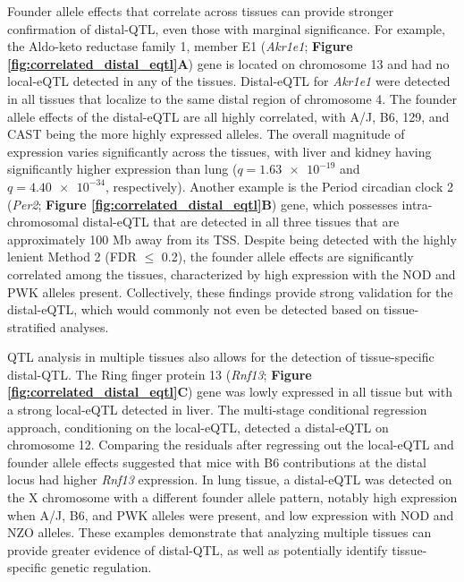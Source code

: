 \documentclass[9pt,twocolumn,twoside]{gsajnl}
\begin{document}
Founder allele effects that correlate across tissues can provide stronger confirmation of distal-QTL, even those with marginal significance. 
For example, the Aldo-keto reductase family 1, member E1 (\textit{Akr1e1}; \textbf{Figure \ref{fig:correlated_distal_eqtl}A}) gene is located on chromosome 13 and had no local-eQTL detected in any of the tissues. Distal-eQTL for \textit{Akr1e1} were detected in all tissues that localize to the same distal region of chromosome 4. The founder allele effects of the distal-eQTL are all highly correlated, with A/J, B6, 129, and CAST being the more highly expressed alleles. The overall magnitude of expression varies significantly across the tissues, with liver and kidney having significantly higher expression than lung ($q = \num{1.63e-19}$ and $q = \num{4.40e-34}$, respectively).
Another example is the Period circadian clock 2 (\textit{Per2}; \textbf{Figure \ref{fig:correlated_distal_eqtl}B}) gene, which possesses intra-chromosomal distal-eQTL that are detected in all three tissues that are approximately 100 Mb away from its TSS. Despite being detected with the highly lenient Method 2 (FDR $\leq$ 0.2), the founder allele effects are significantly correlated among the tissues, characterized by high expression with the NOD and PWK alleles present. Collectively, these findings provide strong validation for the distal-eQTL, which would commonly not even be detected based on tissue-stratified analyses.

QTL analysis in multiple tissues also allows for the detection of tissue-specific distal-QTL. The Ring finger protein 13 (\textit{Rnf13}; \textbf{Figure \ref{fig:correlated_distal_eqtl}C}) gene was lowly expressed in all tissue but with a strong local-eQTL detected in liver. The multi-stage conditional regression approach, conditioning on the local-eQTL, detected a distal-eQTL on chromosome 12. Comparing the residuals after regressing out the local-eQTL and founder allele effects suggested that mice with B6 contributions at the distal locus had higher \textit{Rnf13} expression. In lung tissue, a distal-eQTL was detected on the X chromosome with a different founder allele pattern, notably high expression when A/J, B6, and PWK alleles were present, and low expression with NOD and NZO alleles. These examples demonstrate that analyzing multiple tissues can provide greater evidence of distal-QTL, as well as potentially identify tissue-specific genetic regulation.
\end{document}
